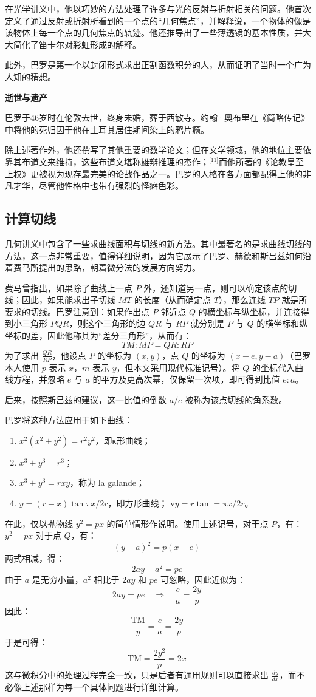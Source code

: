 在光学讲义中，他以巧妙的方法处理了许多与光的反射与折射相关的问题。他首次定义了通过反射或折射所看到的一个点的“几何焦点”，并解释说，一个物体的像是该物体上每一个点的几何焦点的轨迹。他还推导出了一些薄透镜的基本性质，并大大简化了笛卡尔对彩虹形成的解释。

此外，巴罗是第一个以封闭形式求出正割函数积分的人，从而证明了当时一个广为人知的猜想。

\textbf{逝世与遗产}

巴罗于46岁时在伦敦去世，终身未婚，葬于西敏寺。约翰·奥布里在《简略传记》中将他的死归因于他在土耳其居住期间染上的鸦片瘾。

除上述著作外，他还撰写了其他重要的数学论文；但在文学领域，他的地位主要依靠其布道文来维持，这些布道文堪称雄辩推理的杰作；\(^\text{[11]}\)而他所著的《论教皇至上权》更被视为现存最完美的论战作品之一。巴罗的人格在各方面都配得上他的非凡才华，尽管他性格中也带有强烈的怪癖色彩。
\subsection{计算切线}
几何讲义中包含了一些求曲线面积与切线的新方法。其中最著名的是求曲线切线的方法，这一点非常重要，值得详细说明，因为它展示了巴罗、赫德和斯吕兹如何沿着费马所提出的思路，朝着微分法的发展方向努力。

费马曾指出，如果除了曲线上一点 $P$ 外，还知道另一点，则可以确定该点的切线；因此，如果能求出子切线 $MT$ 的长度（从而确定点 $T$），那么连线 $TP$ 就是所要求的切线。巴罗注意到：如果作出点 $P$ 邻近点 $Q$ 的横坐标与纵坐标，并连接得到小三角形 $PQR$，则这个三角形的边 $QR$ 与 $RP$ 就分别是 $P$ 与 $Q$ 的横坐标和纵坐标的差，因此他称其为“差分三角形”，从而有：
$$
TM : MP=QR : RP~
$$
为了求出 $\frac{QR}{RP}$，他设点 $P$ 的坐标为 $(x, y)$，点 $Q$ 的坐标为 $(x - e, y - a)$（巴罗本人使用 $p$ 表示 $x$，$m$ 表示 $y$，但本文采用现代标准记号）。将 $Q$ 的坐标代入曲线方程，并忽略 $e$ 与 $a$ 的平方及更高次幂，仅保留一次项，即可得到比值 $e : a$。

后来，按照斯吕兹的建议，这一比值的倒数 $a/e$ 被称为该点切线的角系数。

巴罗将这种方法应用于如下曲线：

\begin{enumerate}
\item $x^2(x^2 + y^2) = r^2 y^2$，即κ形曲线；
\item $x^3 + y^3 = r^3$；
\item $x^3 + y^3 = rxy$，称为 la galande；
\item $y = (r - x) \tan \pi x/2r$，即方形曲线；
v$y = r \tan =\pi x/2r$。
\end{enumerate}
在此，仅以抛物线 $y^2 = px$ 的简单情形作说明。使用上述记号，对于点 $P$，有：$y^2 = px$
对于点 $Q$，有：
$$
(y - a)^2 = p(x - e)~
$$
两式相减，得：
$$
2ay - a^2 = pe~
$$
由于 $a$ 是无穷小量，$a^2$ 相比于 $2ay$ 和 $pe$ 可忽略，因此近似为：
$$
2ay = pe \quad \Rightarrow \quad \frac{e}{a} = \frac{2y}{p}~
$$
因此：
$$
\frac{\mathrm{TM}}{y} = \frac{e}{a} = \frac{2y}{p}~
$$
于是可得：
$$
\mathrm{TM} = \frac{2y^2}{p} = 2x~
$$
这与微积分中的处理过程完全一致，只是后者有通用规则可以直接求出 $\frac{dy}{dx}$，而不必像上述那样为每一个具体问题进行详细计算。
